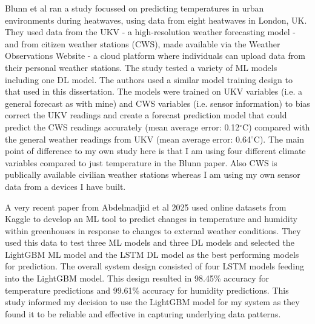 Blunn et al \cite{blunn2024machine} ran a study focussed on predicting
temperatures in urban environments during heatwaves, using data from eight
heatwaves in London, UK. They used data from the UKV - a high-resolution weather
forecasting model - and from citizen weather stations (CWS), made available via
the Weather Observations Website - a cloud platform where individuals can upload
data from their personal weather stations. The study tested a variety of ML
models including one DL model. The authors used a similar model training design
to that used in this dissertation. The models were trained on UKV variables
(i.e. a general forecast as with mine) and CWS variables (i.e. sensor
information) to bias correct the UKV readings and create a forecast prediction
model that could predict the CWS readings accurately (mean average error:
0.12\(^\circ\)C) compared with the general weather readings from UKV (mean
average error: 0.64\(^\circ\)C). The main point of difference to my own study
here is that I am using four different climate variables compared to just
temperature in the Blunn paper. Also CWS is publically available civilian
weather stations whereas I am using my own sensor data from a devices I have
built.

A very recent paper from Abdelmadjid et al 2025 \cite{abdelmadjid2025enhancing}
used online datasets from Kaggle to develop an ML tool to predict changes in
temperature and humidity within greenhouses in response to changes to external
weather conditions.  They used this data to test three ML models and three DL
models and selected the LightGBM ML model and the LSTM DL model as the best
performing models for prediction. The overall system design consisted of four
LSTM models feeding into the LightGBM model. This design resulted in 98.45\%
accuracy for temperature predictions and 99.61\% accuracy for humidity
predictions. This study informed my decision to use the LightGBM model for my
system as they found it  to be reliable and effective in capturing underlying
data patterns. 